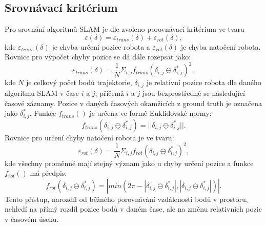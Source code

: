 \documentclass[12pt]{report}
\begin{document}
\subsection{Srovnávací kritérium} \label{kapitola:comparison}
Pro srovnání algoritmů SLAM je dle \cite{Kuemmerle2009} zvoleno porovnávací kritérium ve tvaru
\begin{equation}
	\varepsilon(\delta)=\varepsilon_{trans}(\delta)+\varepsilon_{rot}(\delta),
\end{equation}
kde $\varepsilon_{trans}(\delta)$ je chyba určení pozice robota a $\varepsilon_{rot}(\delta)$ je chyba natočení robota.\\
\indent Rovnice pro výpočet chyby pozice se dá dále rozepsat jako:
\begin{equation}
	\varepsilon_{trans}(\delta)=\frac{1}{N}\Sigma_{i,j}f_{trans}(\delta_{i,j}\ominus\delta^*_{i,j})^2,
\end{equation}
kde $N$ je celkový počet bodů trajektorie, $\delta_{i,j}$ je relativní pozice robota dle daného algoritmu SLAM v čase $i$ a $j$, přičemž $i$ a $j$ jsou bezprostředně se následující časové záznamy. Pozice v daných časových okamžicích z ground truth je označena jako $\delta^*_{i,j}$. Funkce $f_{trans}()$ je určena ve formě Euklidovské normy:
\begin{equation}
	f_{trans}(\delta_{i,j}\ominus\delta^*_{i,j})=||\delta_{i,j}\ominus\delta^*_{i,j}||.
\end{equation}  
Rovnice pro určení chyby natočení robota je ve tvaru:
\begin{equation}
	\varepsilon_{rot}(\delta)=\frac{1}{N}\Sigma_{i,j}f_{rot}(\delta_{i,j}\ominus\delta^*_{i,j})^2,
\end{equation}
kde všechny proměnné mají stejný význam jako u chyby určení pozice a funkce $f_{rot}()$ má předpis:
\begin{equation}
	f_{rot}(\delta_{i,j}\ominus\delta^*_{i,j})=|min(2\pi-|\delta_{i,j}\ominus\delta^*_{i,j}|,|\delta_{i,j}\ominus\delta^*_{i,j}|)|.
\end{equation}
Tento přístup, narozdíl od běžného porovnávání vzdálenosti bodů v prostoru, nehledí na přímý rozdíl pozice bodů v daném čase, ale na změnu relativních pozic v časovém úseku. 

\newpage
\end{document}
